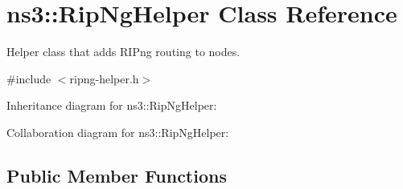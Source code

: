 \hypertarget{classns3_1_1RipNgHelper}{}\section{ns3\+:\+:Rip\+Ng\+Helper Class Reference}
\label{classns3_1_1RipNgHelper}


Helper class that adds R\+I\+Png routing to nodes.  




{\ttfamily \#include $<$ripng-\/helper.\+h$>$}



Inheritance diagram for ns3\+:\+:Rip\+Ng\+Helper\+:


Collaboration diagram for ns3\+:\+:Rip\+Ng\+Helper\+:
\subsection*{Public Member Functions}
